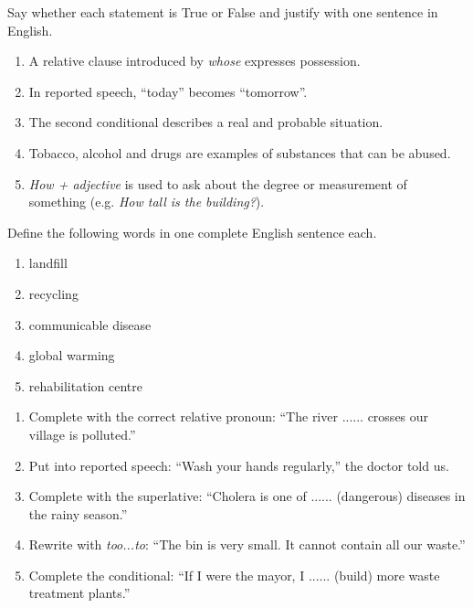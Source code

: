 \documentclass[11pt]{article}
\begin{document}
\begin{exercice}
Say whether each statement is True or False and justify with one sentence in English.

\begin{enumerate}
\item A relative clause introduced by \emph{whose} expresses possession.
\item In reported speech, ``today'' becomes ``tomorrow''.
\item The second conditional describes a real and probable situation.
\item Tobacco, alcohol and drugs are examples of substances that can be abused.
\item \emph{How + adjective} is used to ask about the degree or measurement of something (e.g. \emph{How tall is the building?}).
\end{enumerate}
\end{exercice}

\begin{exercice}[Definitions]
Define the following words in one complete English sentence each.

\begin{enumerate}
\item landfill
\item recycling
\item communicable disease
\item global warming
\item rehabilitation centre
\end{enumerate}
\end{exercice}

\begin{exercice}
\begin{enumerate}
\item Complete with the correct relative pronoun: ``The river ...... crosses our village is polluted.''
\item Put into reported speech: ``Wash your hands regularly,'' the doctor told us.
\item Complete with the superlative: ``Cholera is one of ...... (dangerous) diseases in the rainy season.''
\item Rewrite with \emph{too...to}: ``The bin is very small. It cannot contain all our waste.''
\item Complete the conditional: ``If I were the mayor, I ...... (build) more waste treatment plants.''
\end{enumerate}
\end{exercice}
\end{document}
